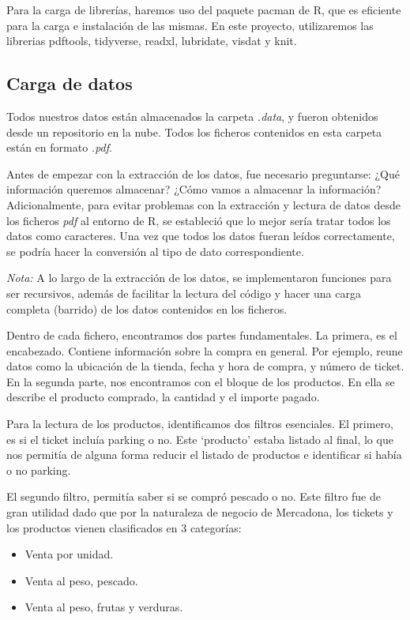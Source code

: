 \documentclass[
]{article}
\providecommand{\tightlist}{%
  \setlength{\itemsep}{0pt}\setlength{\parskip}{0pt}}
\begin{document}
Para la carga de librerías, haremos uso del paquete pacman de R, que es eficiente para la carga e instalación de las mismas. En este proyecto, utilizaremos las librerias pdftools, tidyverse, readxl, lubridate, visdat y knit.

\subsection{Carga de datos}\label{carga-de-datos}

Todos nuestros datos están almacenados la carpeta \emph{.data}, y fueron obtenidos desde un repositorio en la nube. Todos los ficheros contenidos en esta carpeta están en formato \emph{.pdf}.

Antes de empezar con la extracción de los datos, fue necesario preguntarse: ¿Qué información queremos almacenar? ¿Cómo vamos a almacenar la información? Adicionalmente, para evitar problemas con la extracción y lectura de datos desde los ficheros \emph{pdf} al entorno de R, se estableció que lo mejor sería tratar todos los datos como caracteres. Una vez que todos los datos fueran leídos correctamente, se podría hacer la conversión al tipo de dato correspondiente.

\emph{Nota:} A lo largo de la extracción de los datos, se implementaron funciones para ser recursivos, además de facilitar la lectura del código y hacer una carga completa (barrido) de los datos contenidos en los ficheros.

Dentro de cada fichero, encontramos dos partes fundamentales. La primera, es el encabezado. Contiene información sobre la compra en general. Por ejemplo, reune datos como la ubicación de la tienda, fecha y hora de compra, y número de ticket. En la segunda parte, nos encontramos con el bloque de los productos. En ella se describe el producto comprado, la cantidad y el importe pagado.

Para la lectura de los productos, identificamos dos filtros esenciales. El primero, es si el ticket incluía parking o no. Este `producto' estaba listado al final, lo que nos permitía de alguna forma reducir el listado de productos e identificar si había o no parking.

El segundo filtro, permitía saber si se compró pescado o no. Este filtro fue de gran utilidad dado que por la naturaleza de negocio de Mercadona, los tickets y los productos vienen clasificados en 3 categorías:

\begin{itemize}
\tightlist
\item
  Venta por unidad.
\item
  Venta al peso, pescado.
\item
  Venta al peso, frutas y verduras.
\end{itemize}
\end{document}
